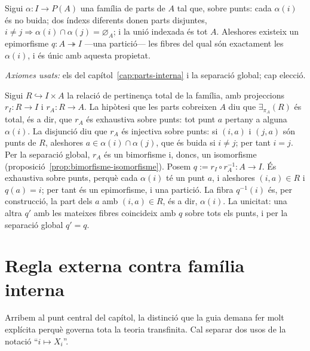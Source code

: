 \begin{proposicio}\label{prop:familia-particio}
Sigui \(\alpha\colon I\to P(A)\) una família de parts de \(A\) tal que,
sobre punts: cada \(\alpha(i)\) és no buida; dos índexs diferents donen
parts disjuntes, \(i\ne j\Rightarrow\alpha(i)\cap\alpha(j)=\varnothing_A\);
i la unió indexada és tot \(A\). Aleshores existeix un epimorfisme
\(q\colon A\twoheadrightarrow I\) ---una partició--- les fibres del qual són
exactament les \(\alpha(i)\), i és únic amb aquesta propietat.\par
\emph{Axiomes usats:} els del capítol~\ref{cap:parts-interna} i la separació
global; cap elecció.
\end{proposicio}

\begin{prova}
Sigui \(R\hookrightarrow I\times A\) la relació de pertinença total de la
família, amb projeccions \(r_I\colon R\to I\) i \(r_A\colon R\to A\). La
hipòtesi que les parts cobreixen \(A\) diu que \(\exists_{\pi_A}(R)\) és
total, és a dir, que \(r_A\) és exhaustiva sobre punts: tot punt \(a\)
pertany a alguna \(\alpha(i)\). La disjunció diu que \(r_A\) és injectiva
sobre punts: si \((i,a)\) i \((j,a)\) són punts de \(R\), aleshores
\(a\in\alpha(i)\cap\alpha(j)\), que és buida si \(i\ne j\); per tant \(i=j\).
Per la separació global, \(r_A\) és un bimorfisme i, doncs, un isomorfisme
(proposició~\ref{prop:bimorfisme-isomorfisme}). Posem
\(q:=r_I\circ r_A^{-1}\colon A\to I\). És exhaustiva sobre punts, perquè
cada \(\alpha(i)\) té un punt \(a\), i aleshores \((i,a)\in R\) i
\(q(a)=i\); per tant és un epimorfisme, i una partició. La fibra
\(q^{-1}(i)\) és, per construcció, la part dels \(a\) amb \((i,a)\in R\), és
a dir, \(\alpha(i)\). La unicitat: una altra \(q'\) amb les mateixes fibres
coincideix amb \(q\) sobre tots els punts, i per la separació global
\(q'=q\).
\end{prova}

\section{Regla externa contra família interna}\label{sec:regla-vs-familia}

Arribem al punt central del capítol, la distinció que la guia demana fer molt
explícita perquè governa tota la teoria transfinita. Cal separar dos usos de
la notació \enquote{\(i\mapsto X_i\)}.

